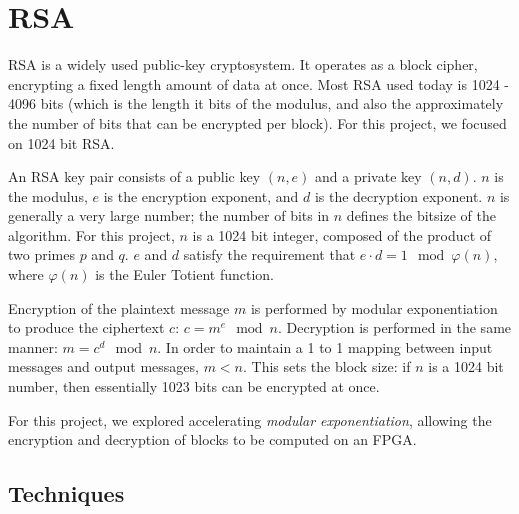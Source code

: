 \section{RSA}

RSA is a widely used public-key cryptosystem. It operates as a block cipher, encrypting a fixed length
amount of data at once. Most RSA used today is 1024 - 4096 bits (which is the length it bits of the 
modulus, and also the approximately the number of bits that can be encrypted per block). 
For this project, we focused on 1024 bit RSA.

An RSA key pair consists of a public key $(n, e)$ and a private key $(n, d)$. $n$ is the modulus,
$e$ is the encryption exponent, and $d$ is the decryption exponent. $n$ is generally a very large number;
the number of bits in $n$ defines the bitsize of the algorithm. For this project, $n$ is a 1024 bit integer,
composed of the product of two primes $p$ and $q$. $e$ and $d$ satisfy the requirement that $e \cdot d = 1 \mod \varphi(n)$,
where $\varphi(n)$ is the Euler Totient function.

Encryption of the plaintext message $m$ is performed by modular exponentiation to produce the ciphertext $c$: $c = m^e \mod n$.
Decryption is performed in the same manner: $m = c^d \mod n$. In order to maintain a 1 to 1 mapping between input messages and output messages,
$m < n$. This sets the block size: if $n$ is a 1024 bit number, then essentially 1023 bits can be encrypted at once.

For this project, we explored accelerating \emph{modular exponentiation}, allowing the encryption and decryption of blocks to be computed on an FPGA.

\subsection{Techniques}

